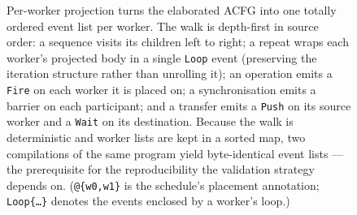 \begin{figure}[tbp]
{}
  \caption[Per-worker projection]{Per-worker projection turns the elaborated
    ACFG into one totally ordered event list per worker. The walk is depth-first
    in source order: a sequence visits its children left to right; a repeat wraps
    each worker's projected body in a single \texttt{Loop} event (preserving the
    iteration structure rather than unrolling it); an operation emits a
    \texttt{Fire} on each worker it is placed on; a synchronisation emits a
    barrier on each participant; and a transfer emits a \texttt{Push} on its
    source worker and a \texttt{Wait} on its destination. Because the walk is
    deterministic and worker lists are kept in a sorted map, two compilations of
    the same program yield byte-identical event lists --- the prerequisite for
    the reproducibility the validation strategy depends on. (\texttt{@\{w0,w1\}}
    is the schedule's placement annotation; \texttt{Loop\{\dots\}} denotes the
    events enclosed by a worker's loop.)}
  \label{fig:projection}
\end{figure}
